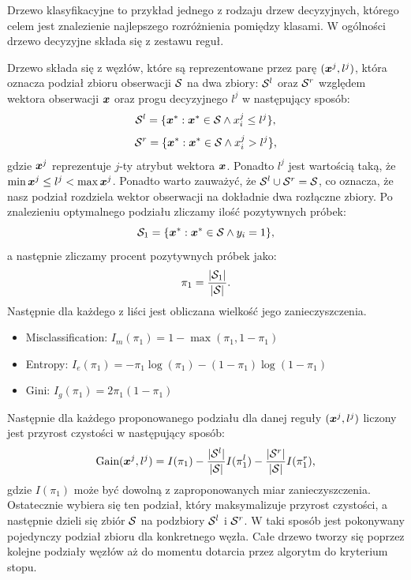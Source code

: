 \documentclass[inzynierska]{pwr_wmat_praca_dyplomowa}
\theoremstyle{plain}
\numberwithin{theorem}{chapter}
\theoremstyle{definition}
\numberwithin{theorem}{chapter}
\begin{document}
Drzewo klasyfikacyjne to przykład jednego z rodzaju drzew decyzyjnych, którego celem jest znalezienie najlepszego rozróżnienia pomiędzy klasami. W ogólności drzewo decyzyjne składa się z zestawu reguł.

Drzewo składa się z węzłów, które są reprezentowane przez parę $(\boldsymbol{x}^j, l^j)$, która oznacza podział zbioru obserwacji $\mathcal{S}$ na dwa zbiory: $\mathcal{S}^{l}$ oraz $\mathcal{S}^{r}$ względem wektora obserwacji $\boldsymbol{x}$ oraz progu decyzyjnego $l^j$ w następujący sposób:
$$ \mathcal{S}^l = \{ \boldsymbol{x}^* : \boldsymbol{x}^* \in \mathcal{S} \land x^j_i \leq l^j \} \text{,} $$
$$ \mathcal{S}^r = \{ \boldsymbol{x}^* : \boldsymbol{x}^* \in \mathcal{S} \land x^j_i > l^j \} \text{,} $$
gdzie $\boldsymbol{x}^j$ reprezentuje $j$-ty atrybut wektora $\boldsymbol{x}$. Ponadto $l^j$ jest wartością taką, że $\min{\boldsymbol{x}^j} \leq l^j < \max{\boldsymbol{x}^j}$. Ponadto warto zauważyć, że $\mathcal{S}^l \cup \mathcal{S}^r = \mathcal{S}$, co oznacza, że nasz podział rozdziela wektor obserwacji na dokładnie dwa rozłączne zbiory.
Po znalezieniu optymalnego podziału zliczamy ilość pozytywnych próbek:
$$ \mathcal{S}_1  = \{ \boldsymbol{x}^* : \boldsymbol{x}^* \in \mathcal{S} \land y_i = 1 \} \text{,} $$
a następnie zliczamy procent pozytywnych próbek jako:
$$ \pi_1 = \frac{|\mathcal{S}_1|}{|\mathcal{S}|} \text{.}$$
Następnie dla każdego z liści jest obliczana wielkość jego zanieczyszczenia.
\begin{itemize}
	\item Misclassification: $I_m(\pi_1) = 1 - \max(\pi_1, 1 - \pi_1)$
	\item Entropy: $I_e(\pi_1) = -\pi_1 \log(\pi_1) - (1 - \pi_1) \log (1 - \pi_1)$
	\item Gini: $I_g(\pi_1) = 2 \pi_1 (1 - \pi_1)$
\end{itemize}{}
Następnie dla każdego proponowanego podziału dla danej reguły $(\boldsymbol{x}^j, l^j)$ liczony jest przyrost czystości w następujący sposób:
$$ \text{Gain}(\boldsymbol{x}^j, l^j) = I(\pi_1) - \frac{|\mathcal{S}^l|}{|\mathcal{S}|} I(\pi_1^l) - \frac{|\mathcal{S}^r|}{|\mathcal{S}|} I(\pi_1^r) \text{,}$$
gdzie $I(\pi_1)$ może być dowolną z zaproponowanych miar zanieczyszczenia.
Ostatecznie wybiera się ten podział, który maksymalizuje przyrost czystości, a następnie dzieli się zbiór $\mathcal{S}$ na podzbiory $\mathcal{S}^l$ i $\mathcal{S}^r$.
W taki sposób jest pokonywany pojedynczy podział zbioru dla konkretnego węzła. Całe drzewo tworzy się poprzez kolejne podziały węzłów aż do momentu dotarcia przez algorytm do kryterium stopu.
\end{document}
